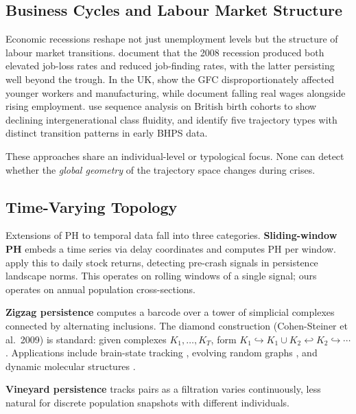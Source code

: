 \subsection{Business Cycles and Labour Market Structure}

Economic recessions reshape not just unemployment levels but the structure of
labour market transitions.
\citet{elsby2010labor} document that the 2008 recession produced both elevated
job-loss rates and reduced job-finding rates, with the latter persisting well
beyond the trough.
In the UK, \citet{gregg2010unemployment} show the GFC disproportionately
affected younger workers and manufacturing, while \citet{blundell2014wages}
document falling real wages alongside rising employment.
\citet{bukodi2019social} use sequence analysis on British birth cohorts to show
declining intergenerational class fluidity, and \citet{halpin1998class} identify
five trajectory types with distinct transition patterns in early BHPS data.

These approaches share an individual-level or typological focus.
None can detect whether the \emph{global geometry} of the trajectory space
changes during crises.

\subsection{Time-Varying Topology}

Extensions of PH to temporal data fall into three categories.
\textbf{Sliding-window PH} \citep{perea2015sliding, perea2019topological}
embeds a time series via delay coordinates and computes PH per window.
\citet{gidea2018topological} apply this to daily stock returns, detecting
pre-crash signals in persistence landscape norms.
This operates on rolling windows of a single signal; ours operates on annual
population cross-sections.

\textbf{Zigzag persistence} \citep{carlsson2010zigzag} computes a barcode over
a tower of simplicial complexes connected by alternating inclusions.
The diamond construction (Cohen-Steiner et al.\ 2009) is standard: given
complexes $K_1, \ldots, K_T$, form $K_1 \hookrightarrow K_1 \cup K_2
\hookleftarrow K_2 \hookrightarrow \cdots$.
Applications include brain-state tracking \citep{bendich2016persistent},
evolving random graphs \citep{dey2019simba}, and dynamic molecular structures
\citep{townsend2020representation}.

\textbf{Vineyard persistence} \citep{cohen2006vines} tracks pairs as a
filtration varies continuously, less natural for discrete population snapshots
with different individuals.

